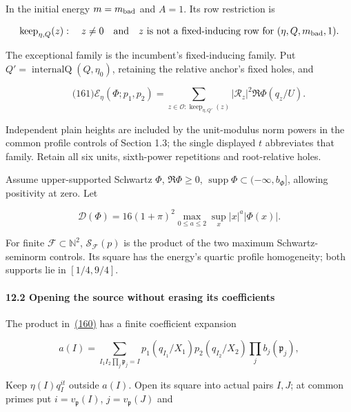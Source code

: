 In the initial energy \(m=m_{\rm bad}\) and \(A=1\). Its row restriction is

\[
\operatorname{keep}_{\eta,Q}(z):\quad z\ne0\quad\hbox{and}\quad
 z\text{ is not a fixed-inducing row for }(\eta,Q,m_{\rm bad},1).
\]

The exceptional family is the incumbent's fixed-inducing family. Put \(Q'=\operatorname{internalQ}(Q,\eta_0)\), retaining the relative anchor's fixed holes, and

\hypertarget{ma:energy}{}

\label{ma:energy}

\[
\qquad\text{(161)}
 \mathcal E_\eta(\Phi;p_1,p_2)
  =\sum_{z\in\mathcal O:\operatorname{keep}_{\eta,Q'}(z)}
          |\mathscr R_z|^2\Re\Phi(q_z/U).
\]

Independent plain heights are included by the unit-modulus norm powers in the common profile controls of Section 1.3; the single displayed \(t\) abbreviates that family. Retain all six units, sixth-power repetitions and root-relative holes.

Assume upper-supported Schwartz \(\Phi\), \(\Re\Phi\ge0\), \(\operatorname{supp}\Phi\subset(-\infty,b_\Phi]\), allowing positivity at zero. Let

\[
\mathcal D(\Phi)=16(1+\pi)^2
       \max_{0\le a\le2}\sup_x |x|^a|\Phi(x)|.
\]

For finite \(\mathcal F\subset\mathbb N^2\), \(\mathcal S_{\mathcal F}(p)\) is the product of the two maximum Schwartz-seminorm controls. Its square has the energy's quartic profile homogeneity; both supports lie in \([1/4,9/4]\).

\hypertarget{opening-the-source-without-erasing-its-coefficients}{}

\label{opening-the-source-without-erasing-its-coefficients}

\hypertarget{opening-the-source-without-erasing-its-coefficients-heading-2}{%
\paragraph{12.2 Opening the source without erasing its coefficients}}

The product in~\protect\hyperlink{ma:positive-row}{(160)} has a finite coefficient expansion

\[
a(I)=\sum_{I_1I_2\prod_j\mathfrak p_j=I}
       p_1(q_{I_1}/X_1)p_2(q_{I_2}/X_2)
       \prod_j b_j(\mathfrak p_j),
\]

Keep \(\eta(I)q_I^{it}\) outside \(a(I)\). Open its square into actual pairs \(I,J\); at common primes put \(i=v_{\mathfrak p}(I)\), \(j=v_{\mathfrak p}(J)\) and

